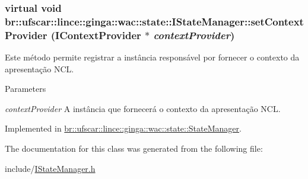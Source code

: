\hypertarget{classbr_1_1ufscar_1_1lince_1_1ginga_1_1wac_1_1state_1_1IStateManager_a3e9493dcb1e1dbfd6171252fb2edca8d}{
\subsubsection[{setContextProvider}]{\setlength{\rightskip}{0pt plus 5cm}virtual void br::ufscar::lince::ginga::wac::state::IStateManager::setContextProvider ({\bf IContextProvider} $\ast$ {\em contextProvider})}}
\label{classbr_1_1ufscar_1_1lince_1_1ginga_1_1wac_1_1state_1_1IStateManager_a3e9493dcb1e1dbfd6171252fb2edca8d}


Este método permite registrar a instância responsável por fornecer o contexto da apresentação NCL. 


\begin{DoxyParams}{Parameters}
\item[{\em contextProvider}]A instância que fornecerá o contexto da apresentação NCL. \end{DoxyParams}


Implemented in \hyperlink{classbr_1_1ufscar_1_1lince_1_1ginga_1_1wac_1_1state_1_1StateManager_a118df2766ab99574653b4f45d1ea75fd}{br::ufscar::lince::ginga::wac::state::StateManager}.



The documentation for this class was generated from the following file:\begin{DoxyCompactItemize}
\item 
include/\hyperlink{IStateManager_8h}{IStateManager.h}\end{DoxyCompactItemize}
